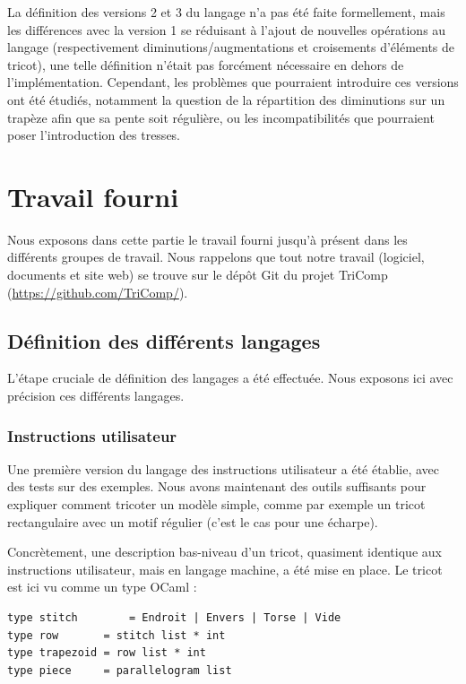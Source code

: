 \documentclass{article}
\begin{document}
La définition des versions 2 et 3 du langage n'a pas été faite formellement, mais les différences avec la version 1 se réduisant à l'ajout de 
nouvelles opérations au langage (respectivement diminutions/augmentations et croisements d'éléments de tricot), une telle définition n'était pas 
forcément nécessaire en dehors de l'implémentation. 
Cependant, les problèmes que pourraient introduire ces versions ont été étudiés, notamment la question de la répartition des diminutions sur un 
trapèze afin que sa pente soit régulière, ou les incompatibilités que pourraient poser l'introduction des tresses. 

\newpage

\section{Travail fourni}

Nous exposons dans cette partie le travail fourni jusqu'à présent dans les différents groupes de travail. Nous rappelons que tout notre travail (logiciel, documents et site web) se trouve sur le dépôt Git du projet TriComp (\url{https://github.com/TriComp/}).

\subsection{Définition des différents langages}

L'étape cruciale de définition des langages a été effectuée. Nous exposons ici avec précision ces différents langages.

\subsubsection{Instructions utilisateur}

Une première version du langage des instructions utilisateur a été établie, avec des tests sur des exemples. Nous avons maintenant des outils
suffisants pour expliquer comment tricoter un modèle simple, comme par exemple un tricot rectangulaire avec un motif régulier (c'est le cas pour une écharpe). 

Concrètement, une description bas-niveau d'un tricot, quasiment identique aux instructions utilisateur, mais en langage machine, a été mise en place.
Le tricot est ici vu comme un type OCaml :
\begin{lstlisting}
type stitch 	   = Endroit | Envers | Torse | Vide
type row 	   = stitch list * int
type trapezoid = row list * int
type piece 	   = parallelogram list
\end{lstlisting}
\end{document}
